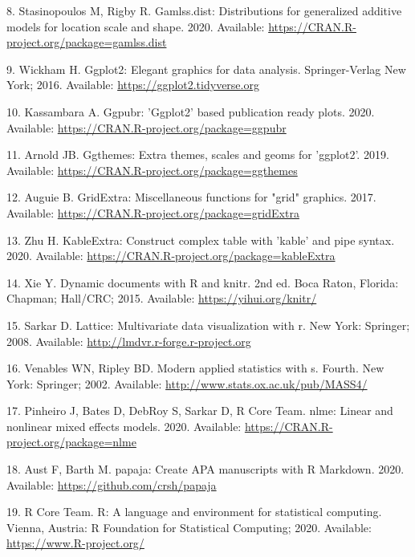 \documentclass[10pt,letterpaper]{article}
\begin{document}
\leavevmode\hypertarget{ref-R-gamlss.dist}{}%
8. Stasinopoulos M, Rigby R. Gamlss.dist: Distributions for generalized
additive models for location scale and shape. 2020. Available:
\url{https://CRAN.R-project.org/package=gamlss.dist}

\leavevmode\hypertarget{ref-R-ggplot2}{}%
9. Wickham H. Ggplot2: Elegant graphics for data analysis.
Springer-Verlag New York; 2016. Available:
\url{https://ggplot2.tidyverse.org}

\leavevmode\hypertarget{ref-R-ggpubr}{}%
10. Kassambara A. Ggpubr: 'Ggplot2' based publication ready plots. 2020.
Available: \url{https://CRAN.R-project.org/package=ggpubr}

\leavevmode\hypertarget{ref-R-ggthemes}{}%
11. Arnold JB. Ggthemes: Extra themes, scales and geoms for 'ggplot2'.
2019. Available: \url{https://CRAN.R-project.org/package=ggthemes}

\leavevmode\hypertarget{ref-R-gridExtra}{}%
12. Auguie B. GridExtra: Miscellaneous functions for "grid" graphics.
2017. Available: \url{https://CRAN.R-project.org/package=gridExtra}

\leavevmode\hypertarget{ref-R-kableExtra}{}%
13. Zhu H. KableExtra: Construct complex table with 'kable' and pipe
syntax. 2020. Available:
\url{https://CRAN.R-project.org/package=kableExtra}

\leavevmode\hypertarget{ref-R-knitr}{}%
14. Xie Y. Dynamic documents with R and knitr. 2nd ed. Boca Raton,
Florida: Chapman; Hall/CRC; 2015. Available:
\url{https://yihui.org/knitr/}

\leavevmode\hypertarget{ref-R-lattice}{}%
15. Sarkar D. Lattice: Multivariate data visualization with r. New York:
Springer; 2008. Available: \url{http://lmdvr.r-forge.r-project.org}

\leavevmode\hypertarget{ref-R-MASS}{}%
16. Venables WN, Ripley BD. Modern applied statistics with s. Fourth.
New York: Springer; 2002. Available:
\url{http://www.stats.ox.ac.uk/pub/MASS4/}

\leavevmode\hypertarget{ref-R-nlme}{}%
17. Pinheiro J, Bates D, DebRoy S, Sarkar D, R Core Team. nlme: Linear
and nonlinear mixed effects models. 2020. Available:
\url{https://CRAN.R-project.org/package=nlme}

\leavevmode\hypertarget{ref-R-papaja}{}%
18. Aust F, Barth M. papaja: Create APA manuscripts with R Markdown.
2020. Available: \url{https://github.com/crsh/papaja}

\leavevmode\hypertarget{ref-R-parallel}{}%
19. R Core Team. R: A language and environment for statistical
computing. Vienna, Austria: R Foundation for Statistical Computing;
2020. Available: \url{https://www.R-project.org/}
\end{document}
